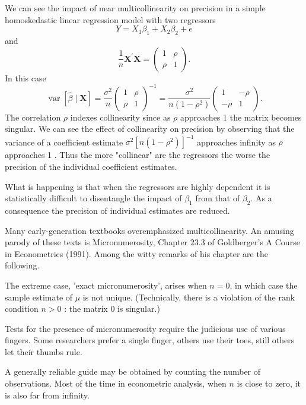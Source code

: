 \documentclass[10pt]{article}
\begin{document}
We can see the impact of near multicollinearity on precision in a simple homoskedastic linear regression model with two regressors
$$
Y=X_{1} \beta_{1}+X_{2} \beta_{2}+e
$$
and
$$
\frac{1}{n} \boldsymbol{X}^{\prime} \boldsymbol{X}=\left(\begin{array}{ll}
1 & \rho \\
\rho & 1
\end{array}\right) .
$$
In this case
$$
\operatorname{var}[\widehat{\beta} \mid \boldsymbol{X}]=\frac{\sigma^{2}}{n}\left(\begin{array}{ll}
1 & \rho \\
\rho & 1
\end{array}\right)^{-1}=\frac{\sigma^{2}}{n\left(1-\rho^{2}\right)}\left(\begin{array}{cc}
1 & -\rho \\
-\rho & 1
\end{array}\right) .
$$
The correlation $\rho$ indexes collinearity since as $\rho$ approaches 1 the matrix becomes singular. We can see the effect of collinearity on precision by observing that the variance of a coefficient estimate $\sigma^{2}\left[n\left(1-\rho^{2}\right)\right]^{-1}$ approaches infinity as $\rho$ approaches 1 . Thus the more "collinear" are the regressors the worse the precision of the individual coefficient estimates.

What is happening is that when the regressors are highly dependent it is statistically difficult to disentangle the impact of $\beta_{1}$ from that of $\beta_{2}$. As a consequence the precision of individual estimates are reduced.

Many early-generation textbooks overemphasized multicollinearity. An amusing parody of these texts is Micronumerosity, Chapter $23.3$ of Goldberger's A Course in Econometrics (1991). Among the witty remarks of his chapter are the following.

The extreme case, 'exact micronumerosity', arises when $n=0$, in which case the sample estimate of $\mu$ is not unique. (Technically, there is a violation of the rank condition $n>0$ : the matrix 0 is singular.)

Tests for the presence of micronumerosity require the judicious use of various fingers. Some researchers prefer a single finger, others use their toes, still others let their thumbs rule.

A generally reliable guide may be obtained by counting the number of observations. Most of the time in econometric analysis, when $n$ is close to zero, it is also far from infinity.
\end{document}
